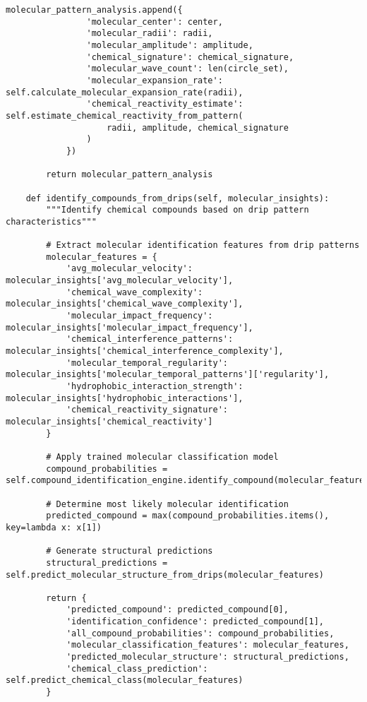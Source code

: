 \documentclass[12pt,a4paper]{article}
\begin{document}
\begin{lstlisting}[style=pythonstyle, caption=Computer Vision Molecular Pattern Analysis]
            molecular_pattern_analysis.append({
                'molecular_center': center,
                'molecular_radii': radii,
                'molecular_amplitude': amplitude,
                'chemical_signature': chemical_signature,
                'molecular_wave_count': len(circle_set),
                'molecular_expansion_rate': self.calculate_molecular_expansion_rate(radii),
                'chemical_reactivity_estimate': self.estimate_chemical_reactivity_from_pattern(
                    radii, amplitude, chemical_signature
                )
            })
        
        return molecular_pattern_analysis
    
    def identify_compounds_from_drips(self, molecular_insights):
        """Identify chemical compounds based on drip pattern characteristics"""
        
        # Extract molecular identification features from drip patterns
        molecular_features = {
            'avg_molecular_velocity': molecular_insights['avg_molecular_velocity'],
            'chemical_wave_complexity': molecular_insights['chemical_wave_complexity'],
            'molecular_impact_frequency': molecular_insights['molecular_impact_frequency'],
            'chemical_interference_patterns': molecular_insights['chemical_interference_complexity'],
            'molecular_temporal_regularity': molecular_insights['molecular_temporal_patterns']['regularity'],
            'hydrophobic_interaction_strength': molecular_insights['hydrophobic_interactions'],
            'chemical_reactivity_signature': molecular_insights['chemical_reactivity']
        }
        
        # Apply trained molecular classification model
        compound_probabilities = self.compound_identification_engine.identify_compound(molecular_features)
        
        # Determine most likely molecular identification
        predicted_compound = max(compound_probabilities.items(), key=lambda x: x[1])
        
        # Generate structural predictions
        structural_predictions = self.predict_molecular_structure_from_drips(molecular_features)
        
        return {
            'predicted_compound': predicted_compound[0],
            'identification_confidence': predicted_compound[1],
            'all_compound_probabilities': compound_probabilities,
            'molecular_classification_features': molecular_features,
            'predicted_molecular_structure': structural_predictions,
            'chemical_class_prediction': self.predict_chemical_class(molecular_features)
        }
    

\end{lstlisting}
\end{document}
